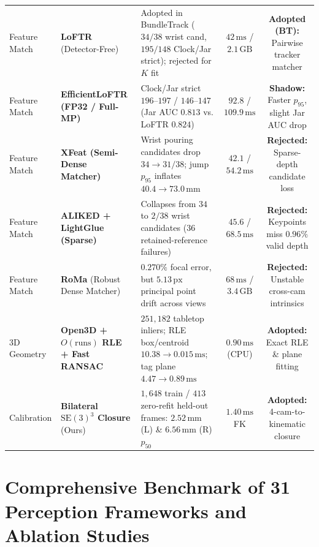 \documentclass[10pt,journal]{IEEEtran}
\begin{document}
\begin{table}[t]
{\begin{tabular}{@{}llp{6.6cm}cc@{}}
        Feature Match & \textbf{LoFTR} (Detector-Free)~\cite{sun2021loftr} & Adopted in BundleTrack ($34/38$ wrist cand, $195/148$ Clock/Jar strict); rejected for $K$ fit & $42\,\mathrm{ms}$ / $2.1\,\mathrm{GB}$ & \textbf{Adopted (BT):} Pairwise tracker matcher \\
        Feature Match & \textbf{EfficientLoFTR (FP32 / Full-MP)}~\cite{wang2024eloftr} & Clock/Jar strict $196$--$197$ / $146$--$147$ (Jar AUC $0.813$ vs. LoFTR $0.824$) & $92.8$ / $109.9\,\mathrm{ms}$ & \textbf{Shadow:} Faster $p_{95}$, slight Jar AUC drop \\
        Feature Match & \textbf{XFeat (Semi-Dense Matcher)}~\cite{potje2024xfeat} & Wrist pouring candidates drop $34 \to 31/38$; jump $p_{95}$ inflates $40.4 \to 73.0\,\mathrm{mm}$ & $42.1$ / $54.2\,\mathrm{ms}$ & \textbf{Rejected:} Sparse-depth candidate loss \\
        Feature Match & \textbf{ALIKED + LightGlue (Sparse)}~\cite{zhao2023aliked,lindenberger2023lightglue} & Collapses from $34$ to $2/38$ wrist candidates ($36$ retained-reference failures) & $45.6$ / $68.5\,\mathrm{ms}$ & \textbf{Rejected:} Keypoints miss $0.96\%$ valid depth \\
        Feature Match & \textbf{RoMa} (Robust Dense Matcher)~\cite{edstedt2024roma} & $0.270\%$ focal error, but $5.13\,\mathrm{px}$ principal point drift across views & $68\,\mathrm{ms}$ / $3.4\,\mathrm{GB}$ & \textbf{Rejected:} Unstable cross-cam intrinsics \\
        3D Geometry & \textbf{Open3D + $O(\text{runs})$ RLE + Fast RANSAC}~\cite{zhou2018open3d,besl1992icp,rusu2009fpfh,fischler1981ransac} & $251{,}182$ tabletop inliers; RLE box/centroid $10.38 \to 0.015\,\mathrm{ms}$; tag plane $4.47 \to 0.89\,\mathrm{ms}$ & $0.90\,\mathrm{ms}$ (CPU) & \textbf{Adopted:} Exact RLE \& plane fitting \\
        Calibration & \textbf{Bilateral $\mathrm{SE}(3)^3$ Closure} (Ours) & $1{,}648$ train / $413$ zero-refit held-out frames: $2.52\,\mathrm{mm}$ (L) \& $6.56\,\mathrm{mm}$ (R) $p_{50}$ & $1.40\,\mathrm{ms}$ FK & \textbf{Adopted:} 4-cam-to-kinematic closure \\
        \bottomrule
    \end{tabular}}
\end{table}

\section{Comprehensive Benchmark of 31 Perception Frameworks and Ablation Studies}
\label{sec:benchmark}
\end{document}
